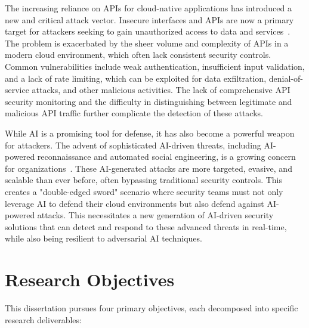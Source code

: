 The increasing reliance on APIs for cloud-native applications has introduced a new and critical attack vector. Insecure interfaces and APIs are now a primary target for attackers seeking to gain unauthorized access to data and services~\cite{isaca2024cloudthreats}. The problem is exacerbated by the sheer volume and complexity of APIs in a modern cloud environment, which often lack consistent security controls. Common vulnerabilities include weak authentication, insufficient input validation, and a lack of rate limiting, which can be exploited for data exfiltration, denial-of-service attacks, and other malicious activities. The lack of comprehensive API security monitoring and the difficulty in distinguishing between legitimate and malicious API traffic further complicate the detection of these attacks.

While AI is a promising tool for defense, it has also become a powerful weapon for attackers. The advent of sophisticated AI-driven threats, including AI-powered reconnaissance and automated social engineering, is a growing concern for organizations~\cite{checkpoint2024aireport}. These AI-generated attacks are more targeted, evasive, and scalable than ever before, often bypassing traditional security controls. This creates a "double-edged sword" scenario where security teams must not only leverage AI to defend their cloud environments but also defend against AI-powered attacks. This necessitates a new generation of AI-driven security solutions that can detect and respond to these advanced threats in real-time, while also being resilient to adversarial AI techniques.


\section{Research Objectives}\label{sec:intro-objectives}
This dissertation pursues four primary objectives, each decomposed into specific research deliverables:

